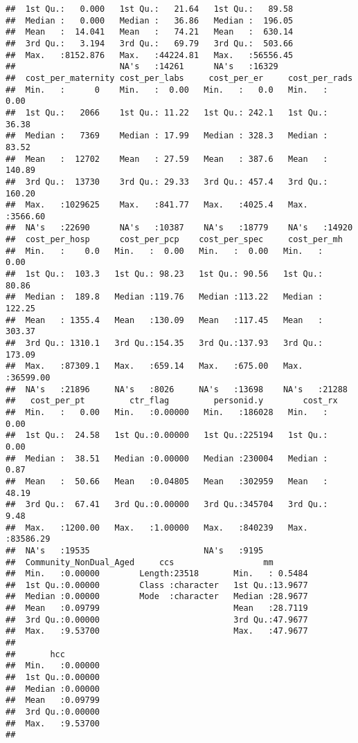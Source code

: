 \documentclass[]{article}
\begin{document}
\begin{verbatim}
##  1st Qu.:   0.000   1st Qu.:   21.64   1st Qu.:   89.58  
##  Median :   0.000   Median :   36.86   Median :  196.05  
##  Mean   :  14.041   Mean   :   74.21   Mean   :  630.14  
##  3rd Qu.:   3.194   3rd Qu.:   69.79   3rd Qu.:  503.66  
##  Max.   :8152.876   Max.   :44224.81   Max.   :56556.45  
##                     NA's   :14261      NA's   :16329     
##  cost_per_maternity cost_per_labs     cost_per_er     cost_per_rads    
##  Min.   :      0    Min.   :  0.00   Min.   :   0.0   Min.   :   0.00  
##  1st Qu.:   2066    1st Qu.: 11.22   1st Qu.: 242.1   1st Qu.:  36.38  
##  Median :   7369    Median : 17.99   Median : 328.3   Median :  83.52  
##  Mean   :  12702    Mean   : 27.59   Mean   : 387.6   Mean   : 140.89  
##  3rd Qu.:  13730    3rd Qu.: 29.33   3rd Qu.: 457.4   3rd Qu.: 160.20  
##  Max.   :1029625    Max.   :841.77   Max.   :4025.4   Max.   :3566.60  
##  NA's   :22690      NA's   :10387    NA's   :18779    NA's   :14920    
##  cost_per_hosp      cost_per_pcp    cost_per_spec     cost_per_mh      
##  Min.   :    0.0   Min.   :  0.00   Min.   :  0.00   Min.   :    0.00  
##  1st Qu.:  103.3   1st Qu.: 98.23   1st Qu.: 90.56   1st Qu.:   80.86  
##  Median :  189.8   Median :119.76   Median :113.22   Median :  122.25  
##  Mean   : 1355.4   Mean   :130.09   Mean   :117.45   Mean   :  303.37  
##  3rd Qu.: 1310.1   3rd Qu.:154.35   3rd Qu.:137.93   3rd Qu.:  173.09  
##  Max.   :87309.1   Max.   :659.14   Max.   :675.00   Max.   :36599.00  
##  NA's   :21896     NA's   :8026     NA's   :13698    NA's   :21288     
##   cost_per_pt         ctr_flag         personid.y        cost_rx        
##  Min.   :   0.00   Min.   :0.00000   Min.   :186028   Min.   :    0.00  
##  1st Qu.:  24.58   1st Qu.:0.00000   1st Qu.:225194   1st Qu.:    0.00  
##  Median :  38.51   Median :0.00000   Median :230004   Median :    0.87  
##  Mean   :  50.66   Mean   :0.04805   Mean   :302959   Mean   :   48.19  
##  3rd Qu.:  67.41   3rd Qu.:0.00000   3rd Qu.:345704   3rd Qu.:    9.48  
##  Max.   :1200.00   Max.   :1.00000   Max.   :840239   Max.   :83586.29  
##  NA's   :19535                       NA's   :9195                       
##  Community_NonDual_Aged     ccs                  mm         
##  Min.   :0.00000        Length:23518       Min.   : 0.5484  
##  1st Qu.:0.00000        Class :character   1st Qu.:13.9677  
##  Median :0.00000        Mode  :character   Median :28.9677  
##  Mean   :0.09799                           Mean   :28.7119  
##  3rd Qu.:0.00000                           3rd Qu.:47.9677  
##  Max.   :9.53700                           Max.   :47.9677  
##                                                             
##       hcc         
##  Min.   :0.00000  
##  1st Qu.:0.00000  
##  Median :0.00000  
##  Mean   :0.09799  
##  3rd Qu.:0.00000  
##  Max.   :9.53700  
## 
\end{verbatim}
\end{document}
